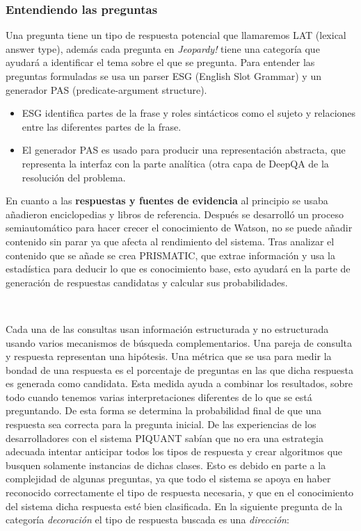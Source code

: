\documentclass[paper=a4, fontsize=10pt]{scrartcl} %
\numberwithin{equation}{section} %
\numberwithin{figure}{section} %
\numberwithin{table}{section} %
\begin{document}
\subsubsection{Entendiendo las preguntas}
Una pregunta tiene un tipo de respuesta potencial que llamaremos LAT (lexical answer type), además cada pregunta en \textit{Jeopardy!} tiene una categoría que ayudará a identificar el tema sobre el que se pregunta. %
Para entender las preguntas formuladas se usa un parser ESG (English Slot Grammar) %
y un generador PAS (predicate-argument structure). 

\begin{itemize}
	\item ESG identifica partes de la frase y roles sintácticos como el sujeto y relaciones entre las diferentes partes de la frase.
	\item El generador PAS es usado para producir una representación abstracta, que representa la interfaz con la parte analítica (otra capa de DeepQA de la resolución del problema.
\end{itemize}

En cuanto a las \textbf{respuestas y fuentes de evidencia} al principio se usaba añadieron enciclopedias y libros de referencia. Después se desarrolló un proceso semiautomático para hacer crecer el conocimiento de Watson, no se puede añadir contenido sin parar ya que afecta al rendimiento del sistema.
Tras analizar el contenido que se añade se crea PRISMATIC, que extrae información y usa la estadística para deducir lo que es conocimiento base, esto ayudará en la parte de generación de respuestas candidatas y calcular sus probabilidades.

\

Cada una de las consultas usan información estructurada y no estructurada usando varios mecanismos de búsqueda complementarios.
Una pareja de consulta y respuesta representan una hipótesis.
Una métrica %
que se usa para medir la bondad de una respuesta es el porcentaje de preguntas en las que dicha respuesta es generada como candidata. 
Esta medida ayuda a combinar los resultados, sobre todo cuando tenemos varias interpretaciones diferentes de lo que se está preguntando.
De esta forma se determina la probabilidad final de que una respuesta sea correcta para la pregunta inicial.
De las experiencias de los desarrolladores con el sistema PIQUANT sabían que no era una estrategia adecuada intentar anticipar todos los tipos de respuesta y crear algoritmos que busquen solamente instancias de dichas clases.
Esto es debido en parte a la complejidad de algunas preguntas, ya que todo el sistema se apoya en haber reconocido correctamente el tipo de respuesta necesaria, y que en el conocimiento del sistema dicha respuesta esté bien clasificada.
En la siguiente pregunta de la categoría \textit{decoración} el tipo de respuesta buscada es una \textit{dirección}:
\end{document}
